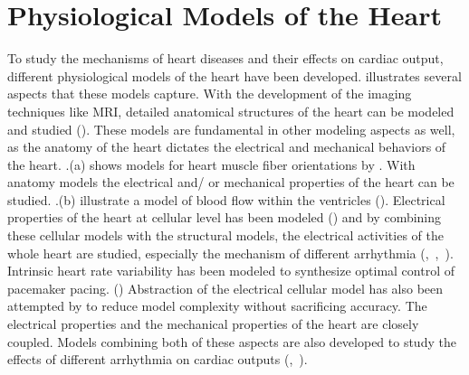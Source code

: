\section{Physiological Models of the Heart}
To study the mechanisms of heart diseases and their effects on cardiac output, different physiological models of the heart have been developed.  illustrates several aspects that these models capture. With the development of the imaging techniques like MRI, detailed anatomical structures of the heart can be modeled and studied (\cite{geometric}). These models are fundamental in other modeling aspects as well, as the anatomy of the heart dictates the electrical and mechanical behaviors of the heart. .(a) shows models for heart muscle fiber orientations by \cite{fiber}. With anatomy models the electrical and/ or mechanical properties of the heart can be studied. .(b) illustrate a model of blood flow within the ventricles (\cite{bloodflow}). Electrical properties of the heart at cellular level has been modeled (\cite{cellular}) and by combining these cellular models with the structural models, the electrical activities of the whole heart are studied, especially the mechanism of different arrhythmia (\cite{natalia},~\cite{Grosu_MHA},~\cite{Grosu_wave}). Intrinsic heart rate variability has been modeled to synthesize optimal control of pacemaker pacing. (\cite{Bogdan}) Abstraction of the electrical cellular model has also been attempted by \cite{Grosu_abstract} to reduce model complexity without sacrificing accuracy. The electrical properties and the mechanical properties of the heart are closely coupled. Models combining both of these aspects are also developed to study the effects of different arrhythmia on cardiac outputs (\cite{natalia},~\cite{eletro_mechanical}).


